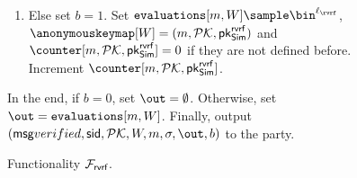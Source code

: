 \begin{figure}
\begin{tcolorbox}
{\begin{description}
\begin{enumerate}[label={{Cond.-} }{{\arabic*}}, start = 1]
					\item Else set $ b = 1 $. Set $ \evaluationslist[m, W]\sample \bin^{\ell_\rvrf}$, $ \anonymouskeymap[W]  = (m, \pkring, \pkrvrf_\simulator)$ and $ \counter[m, \pkring, \pkrvrf_\simulator] = 0 $ if they are not defined before. Increment $ \counter[m, \pkring, \pkrvrf_\simulator]  $. \label{cond:advsignature}
				\end{enumerate}
				In the end, if $ b = 0 $, set $ \out = \emptyset $. Otherwise,  set $ \out = \evaluationslist[m, W]$. 		Finally, output $(\msg{verified}, \sid, \pkring,W, m, \sigma, \out, b)$ to the party.
				
			\end{description}
		
			
		}
	\end{tcolorbox}
	\caption{Functionality $\mathcal{F}_{\textsf{rvrf}}$.\label{f:gvrf}}
\end{figure}
	


